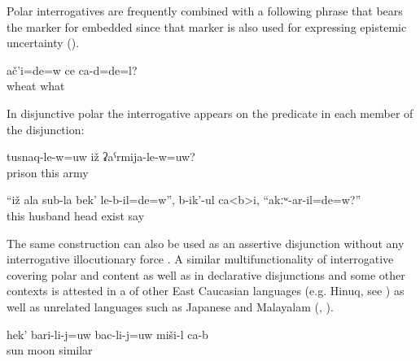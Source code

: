 Polar interrogatives are frequently combined with a following phrase that bears the marker for embedded   since that marker is also used for expressing epistemic uncertainty ().
%
\begin{exe}
	\ex	\label{ex:Was it wheat or something else}
	\gll	ač'i=de=w	ce	ca-d=de=l?\\
		wheat	what	\\
	\glt	{}
\end{exe}

In disjunctive polar  the interrogative  appears on the predicate in each member of the disjunction:
%
\begin{exe}
	\ex	\label{ex:Is he in a prison or in the army}
	\gll	tusnaq-le-w=uw	iž	ʡaˁrmija-le-w=uw?\\
		prison	this	army\\
	\glt	{}

	\ex	\label{ex:‎They say to the wife, Did your husband have a head or not}
	\gll	``iž	ala	sub-la	bek'	le-b-il=de=w'',	b-ik'-ul	ca<b>i,	``akːʷ-ar-il=de=w?''	\\
		this		husband	head	exist	say		\\
	\glt	{}
\end{exe}

The same construction can also be used as an assertive disjunction without any interrogative illocutionary force . A similar multifunctionality of interrogative  covering polar and content  as well as in declarative disjunctions and some other contexts is attested in a  of other East Caucasian languages (e.g. Hinuq, see ) as well as unrelated languages such as Japanese and Malayalam (\citealp[2]{Slade2011}, ). 
%
\begin{exe}
	\ex	\label{ex:This is similar to the sun or the moon}
	\gll	hek'	bari-li-j=uw	bac-li-j=uw	miši-l	ca-b\\
			sun	moon	similar	\\
	\glt	{}
\end{exe}



